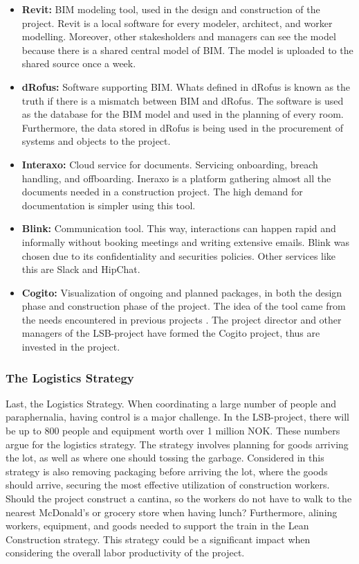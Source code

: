 \begin{itemize}
    \item {\bf Revit:} BIM modeling tool, used in the design and construction of the project. Revit is a local software for every modeler, architect, and worker modelling. Moreover, other stakesholders and managers can see the model because there is a shared central model of BIM. The model is uploaded to the shared source once a week.
    \item {\bf dRofus:} Software supporting BIM. Whats defined in dRofus is known as the truth if there is a mismatch between BIM and dRofus. The software is used as the database for the BIM model and used in the planning of every room. Furthermore, the data stored in dRofus is being used in the procurement of systems and objects to the project. 
    \item {\bf Interaxo:} Cloud service for documents. Servicing onboarding, breach handling, and offboarding. Ineraxo is a platform gathering almost all the documents needed in a construction project. The high demand for documentation is simpler using this tool.
    \item {\bf Blink:} Communication tool. This way, interactions can happen rapid and informally without booking meetings and writing extensive emails. Blink was chosen due to its confidentiality and securities policies. Other services like this are Slack and HipChat.
    \item {\bf Cogito:} Visualization of ongoing and planned packages, in both the design phase and construction phase of the project. The idea of the tool came from the needs encountered in previous projects \cite{lean_i_praksis}. The project director and other managers of the LSB-project have formed the Cogito project, thus are invested in the project.
   \end{itemize}

\subsubsection*{The Logistics Strategy}
Last, the Logistics Strategy. When coordinating a large number of people and paraphernalia, having control is a major challenge. In the LSB-project, there will be up to 800 people and equipment worth over 1 million NOK.  These numbers argue for the logistics strategy. The strategy involves planning for goods arriving the lot, as well as where one should tossing the garbage. Considered in this strategy is also removing packaging before arriving the lot, where the goods should arrive, securing the most effective utilization of construction workers. Should the project construct a cantina, so the workers do not have to walk to the nearest McDonald's or grocery store when having lunch? Furthermore, alining workers, equipment, and goods needed to support the train in the Lean Construction strategy. This strategy could be a significant impact when considering the overall labor productivity of the project. 


